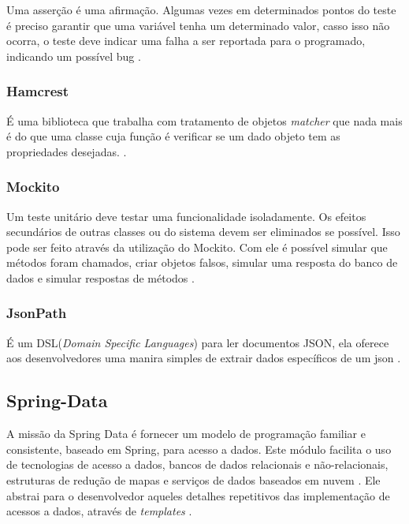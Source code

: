Uma asserção é uma afirmação. Algumas vezes em determinados pontos do teste é preciso garantir que uma variável tenha um determinado valor, casso isso não ocorra, o teste deve indicar uma falha a ser reportada para o programado, indicando um possível bug \cite{junit:2017}.
	
\subsubsection{Hamcrest}\label{subsec:Hamcrest}

	É uma biblioteca que trabalha com tratamento de objetos \textit{matcher} que nada mais é do que uma classe cuja função é verificar se um dado objeto tem as propriedades desejadas. \cite{hamcrest:2017}.

\subsubsection{Mockito}\label{subsec:Mockito}
	
	Um teste unitário deve testar uma funcionalidade isoladamente. Os efeitos secundários de outras classes ou do sistema devem ser eliminados  se possível. Isso pode ser feito através da utilização do Mockito. Com ele é possível simular que métodos foram chamados, criar objetos falsos, simular uma resposta do banco de dados e simular respostas de métodos \cite{mockito:2017}.

\subsubsection{JsonPath}\label{subsec:JsonPath}

	É um  DSL(\textit{Domain Specific Languages}) para ler documentos JSON, ela oferece aos desenvolvedores uma manira simples de extrair dados específicos de um json \cite{JsonPath:2017}.


\subsection{Spring-Data}\label{subsec:SpringData}

A missão da Spring Data é fornecer um modelo de programação familiar e consistente, baseado em Spring, para acesso a dados. Este módulo facilita o uso de tecnologias de acesso a dados, bancos de dados relacionais e não-relacionais, estruturas de redução de mapas e serviços de dados baseados em nuvem \cite{springData:2017}. Ele abstrai para o desenvolvedor aqueles detalhes repetitivos das implementação de acessos a dados, através de \textit{templates} \cite{Weissmann:2012}.

